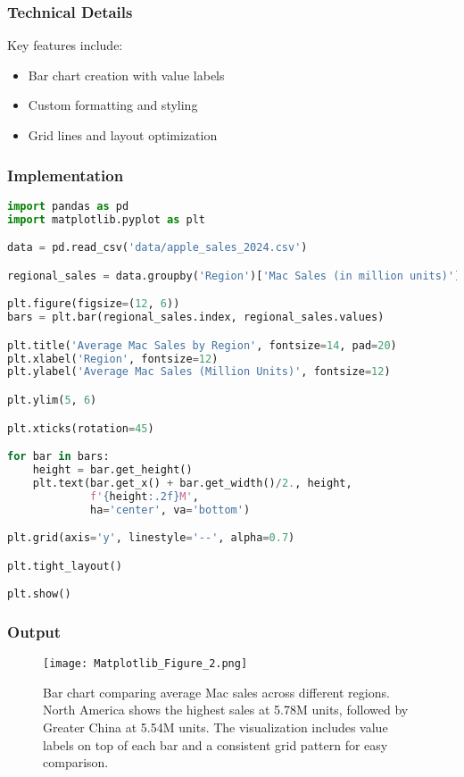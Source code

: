 \documentclass[12pt]{article}
\begin{document}
\subsubsection{Technical Details}
Key features include:
\begin{itemize}
    \item Bar chart creation with value labels
    \item Custom formatting and styling
    \item Grid lines and layout optimization
\end{itemize}

\subsubsection{Implementation}
\begin{lstlisting}[language=Python, caption=Regional Sales Analysis Implementation]
import pandas as pd
import matplotlib.pyplot as plt

data = pd.read_csv('data/apple_sales_2024.csv')

regional_sales = data.groupby('Region')['Mac Sales (in million units)'].mean()

plt.figure(figsize=(12, 6))
bars = plt.bar(regional_sales.index, regional_sales.values)

plt.title('Average Mac Sales by Region', fontsize=14, pad=20)
plt.xlabel('Region', fontsize=12)
plt.ylabel('Average Mac Sales (Million Units)', fontsize=12)

plt.ylim(5, 6)

plt.xticks(rotation=45)

for bar in bars:
    height = bar.get_height()
    plt.text(bar.get_x() + bar.get_width()/2., height,
             f'{height:.2f}M',
             ha='center', va='bottom')

plt.grid(axis='y', linestyle='--', alpha=0.7)

plt.tight_layout()

plt.show()

\end{lstlisting}
\newpage
\subsubsection{Output}
\begin{figure}[h]
    \centering
    \texttt{[image: Matplotlib\_Figure\_2.png]}
    \caption{Bar chart comparing average Mac sales across different regions. North America shows the highest sales at 5.78M units, followed by Greater China at 5.54M units. The visualization includes value labels on top of each bar and a consistent grid pattern for easy comparison.}
    \label{fig:regional_sales}
\end{figure}
\end{document}
